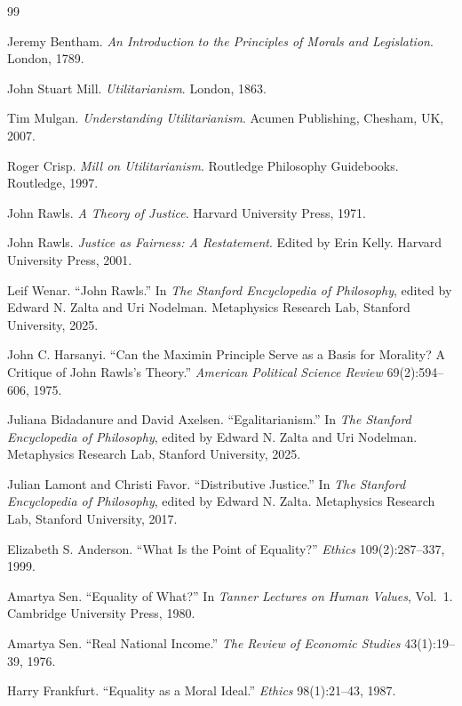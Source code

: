 \documentclass[11pt,a4paper]{article}
\begin{document}
\begin{thebibliography}{99}

 Jeremy Bentham. \emph{An Introduction to the Principles
of Morals and Legislation}. London, 1789.

 John Stuart Mill. \emph{Utilitarianism}. London, 1863.

 Tim Mulgan. \emph{Understanding Utilitarianism}. Acumen
Publishing, Chesham, UK, 2007.

 Roger Crisp. \emph{Mill on Utilitarianism}. Routledge
Philosophy Guidebooks. Routledge, 1997.

 John Rawls. \emph{A Theory of Justice}. Harvard University
Press, 1971.

 John Rawls. \emph{Justice as Fairness: A Restatement}.
Edited by Erin Kelly. Harvard University Press, 2001.

 Leif Wenar. ``John Rawls.'' In \emph{The Stanford
Encyclopedia of Philosophy}, edited by Edward N. Zalta and Uri Nodelman.
Metaphysics Research Lab, Stanford University, 2025.

 John C. Harsanyi. ``Can the Maximin Principle Serve as
a Basis for Morality? A Critique of John Rawls's Theory.'' \emph{American
Political Science Review} 69(2):594--606, 1975.

 Juliana Bidadanure and David Axelsen.
``Egalitarianism.'' In \emph{The Stanford Encyclopedia of Philosophy}, edited
by Edward N. Zalta and Uri Nodelman. Metaphysics Research Lab, Stanford
University, 2025.

 Julian Lamont and Christi Favor. ``Distributive
Justice.'' In \emph{The Stanford Encyclopedia of Philosophy}, edited by Edward
N. Zalta. Metaphysics Research Lab, Stanford University, 2017.

 Elizabeth S. Anderson. ``What Is the Point of
Equality?'' \emph{Ethics} 109(2):287--337, 1999.

 Amartya Sen. ``Equality of What?'' In \emph{Tanner Lectures
on Human Values}, Vol.~1. Cambridge University Press, 1980.

 Amartya Sen. ``Real National Income.'' \emph{The Review of
Economic Studies} 43(1):19--39, 1976.

 Harry Frankfurt. ``Equality as a Moral Ideal.''
\emph{Ethics} 98(1):21--43, 1987.


\end{thebibliography}
\end{document}
